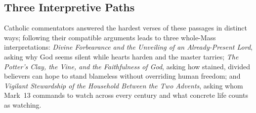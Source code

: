 \subsection{Three Interpretive Paths}

Catholic commentators answered the hardest verses of these passages in distinct ways; following their compatible arguments leads to three whole-Mass interpretations: \emph{Divine Forbearance and the Unveiling of an Already-Present Lord}, asking why God seems silent while hearts harden and the master tarries; \emph{The Potter's Clay, the Vine, and the Faithfulness of God}, asking how stained, divided believers can hope to stand blameless without overriding human freedom; and \emph{Vigilant Stewardship of the Household Between the Two Advents}, asking whom Mark~13 commands to watch across every century and what concrete life counts as watching.
